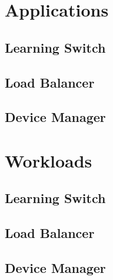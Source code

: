 
\section{Applications}
\glsresetall
\label{sec:feasibility:apps}

\subsection{Learning Switch}
\label{sec:feasibility:apps:ls}

\subsection{Load Balancer}
\label{sec:feasibility:apps:lb}

\subsection{Device Manager}
\label{sec:feasibility:apps:dm}


\section{Workloads}
\glsresetall
\label{sec:feasibility:workloads}
\subsection{Learning Switch}
\label{sec:feasibility:workloads:ls}

\subsection{Load Balancer}
\label{sec:feasibility:workloads:lb}

\subsection{Device Manager}
\label{sec:feasibility:workloads:dm}

